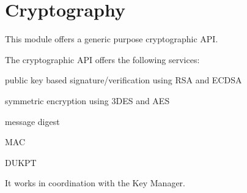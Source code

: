 \hypertarget{group__ssbx___crypto}{}\section{Cryptography}
\label{group__ssbx___crypto}
This module offers a generic purpose cryptographic A\+PI.

The cryptographic A\+PI offers the following services\+:


\begin{DoxyItemize}
\item public key based signature/verification using R\+SA and E\+C\+D\+SA
\item symmetric encryption using 3\+D\+ES and A\+ES
\item message digest
\item M\+AC
\item D\+U\+K\+PT
\end{DoxyItemize}

It works in coordination with the Key Manager. 